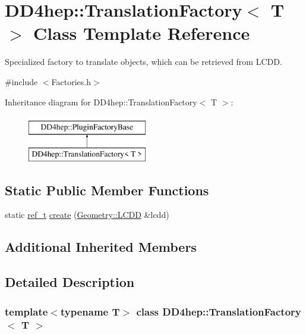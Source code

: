 \hypertarget{class_d_d4hep_1_1_translation_factory}{}\section{D\+D4hep\+:\+:Translation\+Factory$<$ T $>$ Class Template Reference}
\label{class_d_d4hep_1_1_translation_factory}


Specialized factory to translate objects, which can be retrieved from L\+C\+DD.  




{\ttfamily \#include $<$Factories.\+h$>$}

Inheritance diagram for D\+D4hep\+:\+:Translation\+Factory$<$ T $>$\+:\begin{figure}[H]
\begin{center}
\leavevmode
\includegraphics[height=2.000000cm]{class_d_d4hep_1_1_translation_factory}
\end{center}
\end{figure}
\subsection*{Static Public Member Functions}
\begin{DoxyCompactItemize}
\item 
static \hyperlink{struct_d_d4hep_1_1_plugin_factory_base_ab13458952a5b4a91f5130d3ee4db4d33}{ref\+\_\+t} \hyperlink{class_d_d4hep_1_1_translation_factory_a9a32f69ddecbefc80fbeeb1c4a22624b}{create} (\hyperlink{class_d_d4hep_1_1_geometry_1_1_l_c_d_d}{Geometry\+::\+L\+C\+DD} \&lcdd)
\end{DoxyCompactItemize}
\subsection*{Additional Inherited Members}


\subsection{Detailed Description}
\subsubsection*{template$<$typename T$>$\newline
class D\+D4hep\+::\+Translation\+Factory$<$ T $>$}

